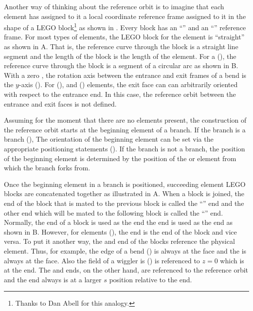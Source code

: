 
Another way of thinking about the reference orbit is to imagine that each element has assigned to it
a local coordinate reference frame assigned to it in the shape of a LEGO block\footnote{Thanks to
Dan Abell for this analogy.} as shown in .  Every block has an
``'' and an ``'' reference frame.  For most types of elements, the LEGO block
for the element is ``straight'' as shown in A. That is, the reference curve
through the block is a straight line segment and the length of the block is the length of the
element. For a  (), the reference curve through the block is a segment of a
circular arc as shown in B. With a zero , the rotation axis
between the entrance and exit frames of a bend is the $y$-axis (). For 
(), and  () elements, the exit face can can
arbitrarily oriented with respect to the entrance end. In this case, the reference orbit between the
entrance and exit faces is not defined.

Assuming for the moment that there are no  elements present, the construction of the
reference orbit starts at the beginning element of a branch. If the branch is a  branch
(), The orientation of the beginning element can be set via the appropriate
positioning statements (). If the branch is not a  branch, the position
of the beginning element is determined by the position of the  or  element
from which the branch forks from.

Once the beginning element in a branch is positioned, succeeding element LEGO blocks are
concatenated together as illustrated in A. When a block is joined, the end of the
block that is mated to the previous block is called the ``'' end and the other end
which will be mated to the following block is called the ``'' end.  Normally, the
 end of a block is used as the  end the  end is used as the
 end as shown in B. However, for  elements
(), the  end is the  end of the block and vice versa. To
put it another way, the  and  end of the blocks reference the physical
element. Thus, for example, the  edge of a bend () is always at the
 face and the  is always at the face. Also the field of a wiggler is
() is referenced to $z = 0$ which is at the  end. The  and
 ends, on the other hand, are referenced to the reference orbit and the
 end always is at a larger $s$ position relative to the  end.

